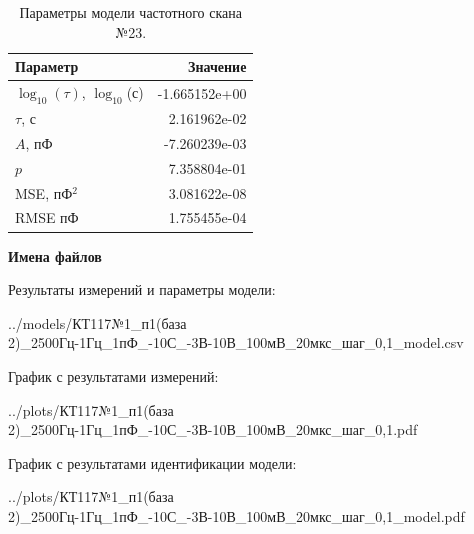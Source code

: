 \begin{table}[!ht]
    \centering
    \caption{Параметры модели частотного скана №23.}
    \begin{tabular}{|l|r|}
        \hline
        Параметр                                       & Значение                  \\ \hline
        $\log_{10}(\tau)$, $\log_{10}$(с)              & -1.665152e+00             \\ \hline
        $\tau$, с                                      & 2.161962e-02              \\ \hline
        $A$, пФ                                        & -7.260239e-03             \\ \hline
        $p$                                            & 7.358804e-01              \\ \hline
        MSE, пФ$^2$                                    & 3.081622e-08              \\ \hline
        RMSE пФ                                        & 1.755455e-04              \\ \hline
    \end{tabular}
    \label{table:frequency_scan_model_23}
\end{table}

\textbf{Имена файлов}

Результаты измерений и параметры модели:

\scriptsize../models/КТ117№1\_п1(база 2)\_2500Гц-1Гц\_1пФ\_-10С\_-3В-10В\_100мВ\_20мкс\_шаг\_0,1\_model.csv
\normalsize

График с результатами измерений:

\scriptsize../plots/КТ117№1\_п1(база 2)\_2500Гц-1Гц\_1пФ\_-10С\_-3В-10В\_100мВ\_20мкс\_шаг\_0,1.pdf
\normalsize

График с результатами идентификации модели:

\scriptsize../plots/КТ117№1\_п1(база 2)\_2500Гц-1Гц\_1пФ\_-10С\_-3В-10В\_100мВ\_20мкс\_шаг\_0,1\_model.pdf
\normalsize

